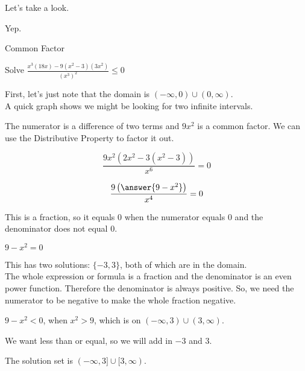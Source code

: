 \documentclass{ximera}
\begin{document}
Let's take a look.







\begin{center}
\end{center}


Yep.








\begin{example}  Common Factor


Solve $\frac{x^3 (18x) - 9(x^2-3)(3x^2)}{(x^3)^2} \leq 0$



\begin{explanation}

First, let's just note that the domain is $(-\infty, 0) \cup (0, \infty)$. \\

A quick graph shows we might be looking for two infinite intervals.



\begin{center}
\end{center}







The numerator is a difference of two terms and $9 x^2$ is a common factor.  We can use the Distributive Property to factor it out.



\[ \frac{9x^2 (2x^2 - 3(x^2-3))}{x^6} = 0 \]


\[ \frac{9 \left( \answer{9 - x^2} \right)}{x^4} = 0 \]



This is a fraction, so it equals $0$ when the numerator equals $0$ and the denominator does not equal $0$.


$9 - x^2 = 0$

This has two solutions: $\{ -3, 3  \}$, both of which are in the domain. \\


The whole expression or formula is a fraction and the denominator is an even power function. Therefore the denominator is always positive. So, we need the numerator to be negative to make the whole fraction negative.


$9 - x^2 < 0$, when $x^2 > 9$, which is on $(-\infty, 3) \cup (3, \infty)$.

We want less than or equal, so we will add in $-3$ and $3$.


The solution set is $(-\infty, 3] \cup [3, \infty)$.


\end{explanation}
\end{example}
\end{document}
